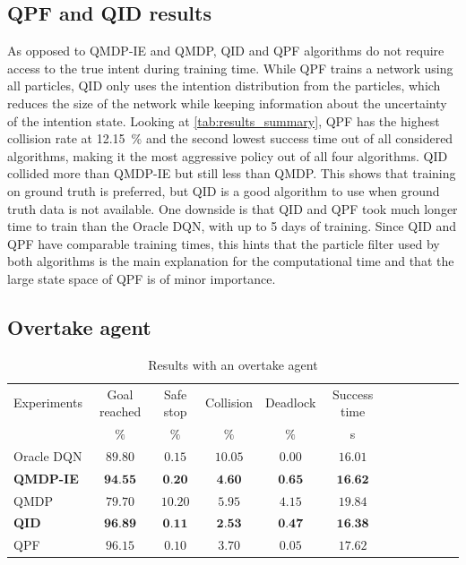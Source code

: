 \subsection{QPF and QID results}
As opposed to QMDP-IE and QMDP, QID and QPF algorithms do not require access to the true intent during training time. While QPF trains a network using all particles, QID only uses the intention distribution from the particles, which reduces the size of the network while keeping information about the uncertainty of the intention state. 
Looking at \ref{tab:results_summary}, QPF has the highest collision rate at \SI{12.15}{\percent} and the second lowest success time out of all considered algorithms, making it the most aggressive policy out of all four algorithms. 
QID collided more than QMDP-IE but still less than QMDP. This shows that training on ground truth is preferred, but QID is a good algorithm to use when ground truth data is not available. 
One downside is that QID and QPF took much longer time to train than the Oracle DQN, with up to 5 days of training. Since QID and QPF have comparable training times, this hints that the particle filter used by both algorithms is the main explanation for the computational time and that the large state space of QPF is of minor importance.


\subsection{Overtake agent}
\begin{table}
\caption{Results with an overtake agent}
\label{tab:results_overtake}
\begin{tabularx}{\columnwidth}{@{}l*{10}{c}c@{}}
\toprule
Experiments & Goal reached & Safe stop & Collision & Deadlock & Success time \\ 
     & $\%$ & $\%$ & $\%$ & $\%$ & s \\ 
\midrule
Oracle DQN & $89.80$ & $0.15$ & $10.05$ & $0.00$ & $16.01$ \\ 
\textbf{QMDP-IE} & $\textbf{94.55}$ & $\textbf{0.20}$ & $\textbf{4.60}$ & $\textbf{0.65}$ & $\textbf{16.62}$ \\ 
QMDP & $79.70$ & $10.20$ & $5.95$ & $4.15$ & $19.84$ \\ 
\textbf{QID} & $\textbf{96.89}$ & $\textbf{0.11}$ & $\textbf{2.53}$ & $\textbf{0.47}$ & $\textbf{16.38}$ \\ 
QPF & $96.15$ & $0.10$ & $3.70$ & $0.05$ & $17.62$ \\ 
\bottomrule
\end{tabularx}
\end{table}

